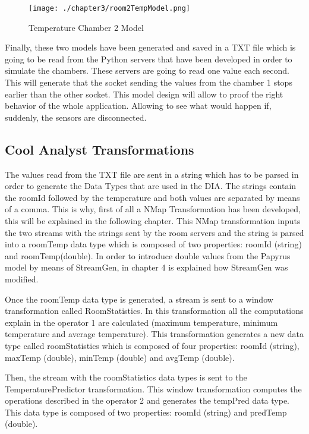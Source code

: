 \begin{figure}
\centering
{\texttt{[image: ./chapter3/room2TempModel.png]}}
\caption{Temperature Chamber 2 Model}
\label{fig:Temperature Chamber 2 Model}
\end{figure}

Finally, these two models have been generated and saved in a TXT file which is going to be read from the Python servers that have been developed in order to simulate the chambers. These servers are going to read one value each second. This will generate that the socket sending the values from the chamber 1 stops earlier than the other socket. This model design will allow to proof the right behavior of the whole application. Allowing to see what would happen if, suddenly, the sensors are disconnected.

\subsection{Cool Analyst Transformations}

The values read from the TXT file are sent in a string which has to be parsed in order to generate the Data Types that are used in the DIA. The strings contain the roomId followed by the temperature and both values are separated by means of a comma. This is why, first of all a NMap Transformation has been developed, this will be explained in the following chapter. This NMap transformation inputs the two streams with the strings sent by the room servers and the string is parsed into a roomTemp data type which is composed of two properties: roomId (string) and roomTemp(double). In order to introduce double values from the Papyrus model by means of StreamGen, in chapter 4 is explained how StreamGen was modified.

Once the roomTemp data type is generated, a stream is sent to a window transformation called RoomStatistics. In this transformation all the computations explain in the operator 1 are calculated (maximum temperature, minimum temperature and average temperature). This transformation generates a new data type called roomStatistics which is composed of four properties: roomId (string), maxTemp (double), minTemp (double) and avgTemp (double).

Then, the stream with the roomStatistics data types is sent to the TemperaturePredictor transformation. This window transformation computes the operations described in the operator 2 and generates the tempPred data type. This data type is composed of two properties: roomId (string) and predTemp (double).

